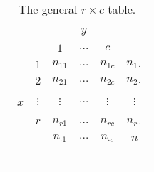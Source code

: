 
\begin{center}
\begin{longtable}{cc|ccc|c} 
\caption{The general $r \times c$ table. \label{SI:rtimesc}} \\
    &           &                &  $y$      &          &  \\\
    &           &    $1$         &  $\dots$  &   $c$    & \\ \hline
    &    $1$    &  $n_{11}$      &  $\dots$  &  $n_{1c}$  &  $n_{1 \cdot}$ \\\
    &    $2$    &  $n_{21}$      &  $\dots$  &  $n_{2c}$  &  $n_{2 \cdot}$ \\\
$x$ & $\vdots$  &  $\vdots$      &  $\dots$  &  $\vdots$  &  $\vdots$ \\\     
    &    $r$      &  $n_{r1}$      &  $\dots$  &  $n_{rc}$  &  $n_{r \cdot}$ \\ \hline
    &           &  $n_{\cdot 1}$  &  $\dots$  &  $n_{\cdot c}$  &  $n$ \\\ 
\end{longtable}
\end{center}
